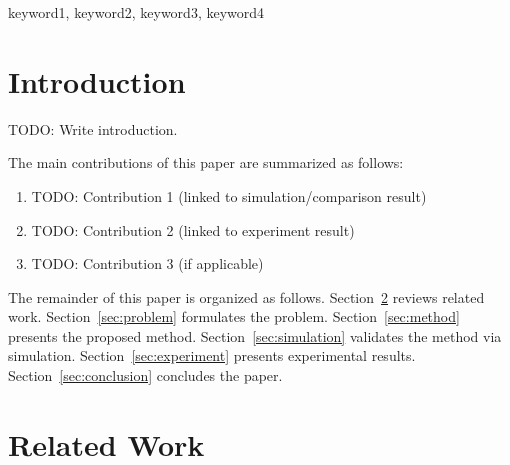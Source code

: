 \documentclass[journal]{IEEEtran}
\begin{document}
\begin{IEEEkeywords}
keyword1, keyword2, keyword3, keyword4
\end{IEEEkeywords}

\section{Introduction}
\label{sec:intro}
%

TODO: Write introduction.

The main contributions of this paper are summarized as follows:
\begin{enumerate}
  \item TODO: Contribution 1 (linked to simulation/comparison result)
  \item TODO: Contribution 2 (linked to experiment result)
  \item TODO: Contribution 3 (if applicable)
\end{enumerate}

The remainder of this paper is organized as follows.
Section~\ref{sec:related} reviews related work.
Section~\ref{sec:problem} formulates the problem.
Section~\ref{sec:method} presents the proposed method.
Section~\ref{sec:simulation} validates the method via simulation.
Section~\ref{sec:experiment} presents experimental results.
Section~\ref{sec:conclusion} concludes the paper.


\section{Related Work}
\label{sec:related}
\end{document}
